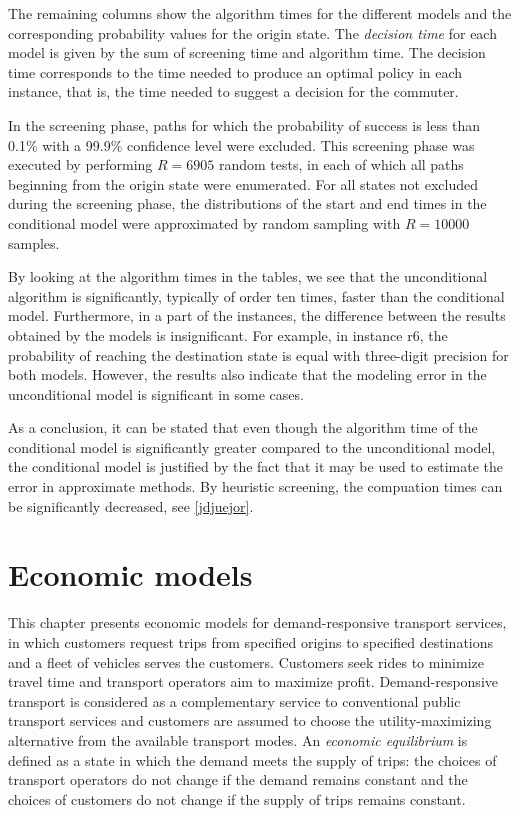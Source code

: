 \documentclass[dissertation,draft*]{aaltoseries}
\begin{document}
The remaining columns show the algorithm times for the different models and the corresponding probability values for the 
origin state. The \emph{decision time} for each model is given by the sum of screening time and algorithm time.
The decision time corresponds to the time needed to produce an optimal policy in each instance, that is, 
the time needed to suggest a decision for the commuter.

In the screening phase, paths for
which the probability of success is less than 0.1\% with a 99.9\% confidence level were excluded.
This screening phase was executed by performing $R=6905$ random tests, in each of which all paths
beginning from the origin state were enumerated.
For all states not excluded during the screening phase, the distributions of the start and end times in the conditional model were 
approximated by random sampling with $R=10000$ samples.

By looking at the algorithm times in the tables,  
we see that the unconditional algorithm is significantly, typically of order ten times, faster than the  conditional model.
Furthermore, in a part of the instances, the difference between the results obtained by the 
models is insignificant. For example, in instance r6, the probability of reaching the destination state
is equal with three-digit precision for both models.
However, the results also indicate that the modeling error in the unconditional model is significant in some cases. 

As a conclusion, it can be stated that even though the algorithm time of the conditional model is significantly greater 
compared to the unconditional model, the conditional model is justified by the fact that it may be used to
estimate the error in approximate methods. By heuristic screening, the compuation times can be significantly
decreased, see \ref{jdjuejor}.

\chapter{Economic models}
\label{economicmodels}
This chapter presents economic models for demand-responsive transport services, in which customers request trips from specified origins to specified destinations and a fleet of vehicles serves the customers. Customers seek rides to minimize travel time and transport operators aim to maximize profit. 
Demand-responsive transport is considered as a complementary service to conventional public transport services and 
customers are assumed to choose the utility-maximizing alternative from the available transport modes.
An \emph{economic equilibrium} is defined as a state in which the demand meets the supply of trips: 
the choices of transport operators
do not change if the demand remains constant and the choices of customers
do not change if the supply of trips remains constant. 
\end{document}

